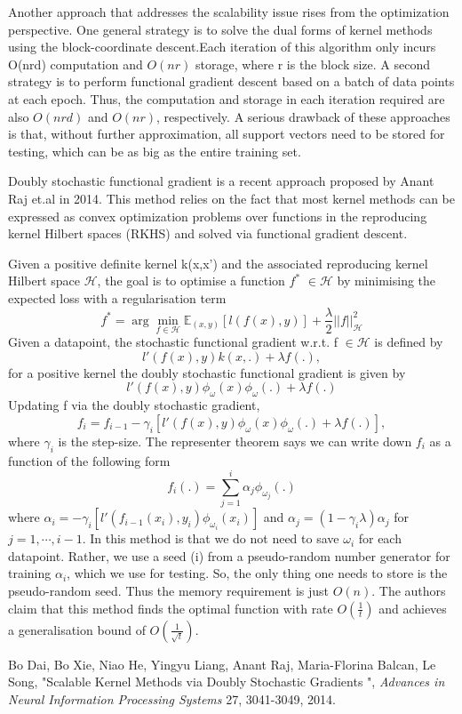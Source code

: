 \documentclass{article}
\begin{document}
Another approach that addresses the scalability issue rises from the optimization perspective. One general strategy is to solve the dual forms of kernel methods using the block-coordinate descent.Each iteration of this algorithm only incurs O(nrd) computation and $O(nr)$ storage, where r is the block size. A second strategy is to perform functional gradient descent based on a batch of data points at each epoch. Thus, the computation and storage in each iteration required are also $O(nrd)$ and $O(nr)$, respectively.  A serious drawback of these approaches is that, without further approximation, all support
vectors need to be stored for testing, which can be as big as the entire training set\cite{ananth}.

Doubly stochastic functional gradient is a recent approach proposed by  Anant Raj et.al in 2014. This method relies on the fact that most kernel methods can be expressed as convex optimization problems over functions in the reproducing kernel Hilbert spaces (RKHS)
and solved via functional gradient descent. 

Given a positive definite kernel k(x,x') and the associated reproducing kernel Hilbert space $\mathcal{H}$, the goal is to optimise a function $f^*$ $\in \mathcal{H}$ by minimising the expected loss with a regularisation term
\[ f^* = \arg\min_{f \in \mathcal{H}} \mathbb{E}_{(x, y)}[l(f(x), y)] + \frac{\lambda}{2} ||f||^2_{\mathcal{H}} \]
Given a datapoint, the stochastic functional gradient w.r.t. f $\in \mathcal{H}$ is defined by
\[l'(f(x),y)k(x,.)+\lambda f(.), \]
for a positive kernel the doubly stochastic functional gradient is given by
\[l'(f(x),y)\phi_{\omega}(x)\phi_{\omega}(.)+\lambda f(.)\]
Updating f via the doubly stochastic gradient,
\[f_i = f_{i-1} - \gamma_i [l'(f(x),y)\phi_{\omega}(x)\phi_{\omega}(.)+\lambda f(.)], \] 
where $\gamma_i$  is the step-size. The representer theorem says we can write down $f_i$ as a function of the following form
\[ f_i(.) = \sum_{j=1}^i \alpha_j \phi_{\omega_j}(.) \]
where $\alpha_i = - \gamma_i [ l'(f_{i-1}(x_i), y_i)\phi_{\omega_{i}}(x_i)]$ and $\alpha_j = (1-\gamma_i \lambda)\alpha_j$  for $j=1, \cdots, i-1$. In  this method is that we do not need to save $\omega_i$ for each datapoint. Rather, we use a seed (i) from a pseudo-random number generator for training $\alpha_i$, which we use for testing. So, the only thing one needs to store is the pseudo-random seed. Thus the memory requirement is just $O(n)$. The authors claim that this method finds the optimal function with rate $O(\frac{1}{t})$ and achieves a generalisation bound of $O(\frac{1}{\sqrt{t}})$.



\begin{thebibliography}{9}
  Bo Dai, Bo Xie, Niao He, Yingyu Liang, Anant Raj, Maria-Florina Balcan, Le Song, "Scalable Kernel Methods via Doubly Stochastic Gradients ", \emph{Advances in Neural Information Processing Systems } 27,  3041-3049, 2014. 

\end{thebibliography}
\end{document}
